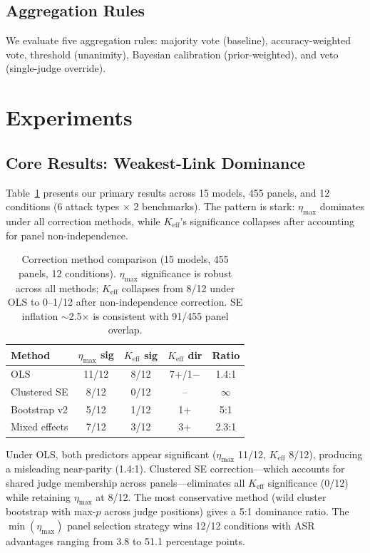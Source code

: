 \documentclass[11pt,a4paper]{article}
\begin{document}
\subsection{Aggregation Rules}

We evaluate five aggregation rules: majority vote (baseline), accuracy-weighted vote, threshold (unanimity), Bayesian calibration (prior-weighted), and veto (single-judge override).

\section{Experiments}

\subsection{Core Results: Weakest-Link Dominance}
\label{sec:core}

Table~\ref{tab:correction} presents our primary results across 15 models, 455 panels, and 12 conditions (6 attack types $\times$ 2 benchmarks). The pattern is stark: $\eta_{\max}$ dominates under all correction methods, while $K_{\text{eff}}$'s significance collapses after accounting for panel non-independence.

\begin{table}[t]
\centering
\small
\begin{tabular}{lcccc}
\toprule
\textbf{Method} & \textbf{$\eta_{\max}$ sig} & \textbf{$K_{\text{eff}}$ sig} & \textbf{$K_{\text{eff}}$ dir} & \textbf{Ratio} \\
\midrule
OLS & 11/12 & 8/12 & 7+/1$-$ & 1.4:1 \\
Clustered SE & 8/12 & 0/12 & -- & $\infty$ \\
Bootstrap v2 & 5/12 & 1/12 & 1+ & 5:1 \\
Mixed effects & 7/12 & 3/12 & 3+ & 2.3:1 \\
\bottomrule
\end{tabular}
\caption{Correction method comparison (15 models, 455 panels, 12 conditions). $\eta_{\max}$ significance is robust across all methods; $K_{\text{eff}}$ collapses from 8/12 under OLS to 0--1/12 after non-independence correction. SE inflation $\sim$2.5$\times$ is consistent with 91/455 panel overlap.}
\label{tab:correction}
\end{table}

Under OLS, both predictors appear significant ($\eta_{\max}$ 11/12, $K_{\text{eff}}$ 8/12), producing a misleading near-parity (1.4:1). Clustered SE correction---which accounts for shared judge membership across panels---eliminates all $K_{\text{eff}}$ significance (0/12) while retaining $\eta_{\max}$ at 8/12. The most conservative method (wild cluster bootstrap with max-$p$ across judge positions) gives a 5:1 dominance ratio. The $\min(\eta_{\max})$ panel selection strategy wins 12/12 conditions with ASR advantages ranging from 3.8 to 51.1 percentage points.
\end{document}
